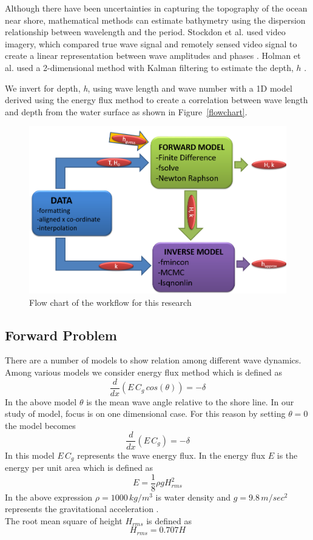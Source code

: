 Although there have been uncertainties in capturing the topography of the ocean near shore, mathematical methods can estimate bathymetry using the dispersion relationship between wavelength and the period. Stockdon et al. used video imagery, which compared true wave signal and remotely sensed video signal to create a linear representation between wave amplitudes and phases \citep{stockdon2000}.  Holman et al. used a 2-dimensional method with Kalman filtering to estimate the depth, $h$ \citep{holman2013}.

We invert for depth, \textit{h}, using wave length and wave number with a 1D model derived using the energy flux method to create a correlation between wave length and depth from the water surface as shown in Figure~\ref{flowchart}.

\begin{figure}[h]
		\centering
		\includegraphics[width=.60\linewidth]{img/Flow_Chart.png}
		\caption{Flow chart of the workflow for this research}
		\label{AWAC}
\end{figure}

\subsection{Forward Problem}\label{forwardproblem}

There are a number of models to show relation among different wave dynamics. Among various models we consider energy flux method which is defined as
$${\frac{d}{dx}}\left( E\,C_{g}\,cos (\theta)\right)= -\delta$$
In the above model ${\theta}$ is the mean wave angle relative to the shore line. In our study of model, focus is on one dimensional case. For this reason by setting ${\theta=0}$ the model becomes
\begin{equation}\label{eqn:forward}
\frac{d}{dx}\left(E\,C_{g}\right)=-\delta
\end{equation} 
In this model ${E\,C_{g}}$ represents the wave energy flux. In the energy flux ${E}$ is the energy per unit area which is defined as
\begin{equation}\label{eqn:energy}
E=\frac{1}{8}\rho g H_{rms}^2
\end{equation}
In the above expression ${\rho=1000\,kg/m^3}$ is water density   and ${g=9.8 \,m/sec^2}$ represents the gravitational acceleration . \\
The root mean square of height ${H_{rms}}$ is defined as\\
$${H_{rms}=0.707 H}$$\\

